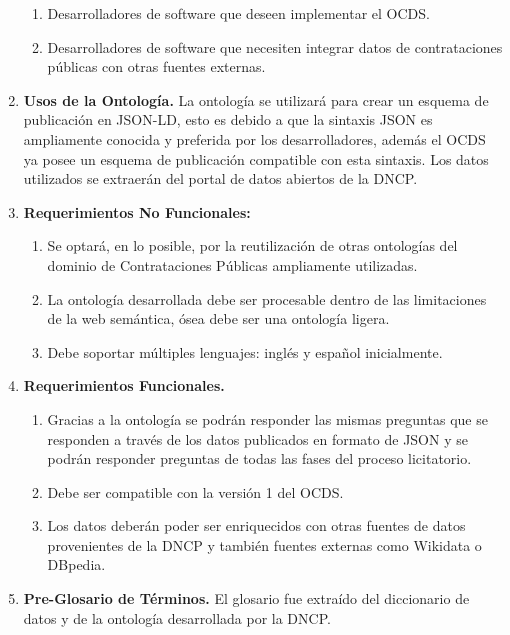 \begin{enumerate}
\begin{enumerate}
    \item Desarrolladores de software que deseen implementar el OCDS.
    \item Desarrolladores de software que necesiten integrar datos de contrataciones públicas con otras fuentes externas. \end{enumerate}
\item \textbf{Usos de la Ontología. }La ontología se utilizará para crear un esquema de publicación en JSON-LD, esto es debido a que la sintaxis JSON es ampliamente conocida y preferida por los desarrolladores, además el OCDS ya posee un esquema de publicación compatible con esta sintaxis. Los datos utilizados se extraerán del portal de datos abiertos de la DNCP.
\item \textbf{Requerimientos No Funcionales: }
\begin{enumerate}
    \item Se optará, en lo posible, por la reutilización de otras ontologías del dominio de Contrataciones Públicas ampliamente utilizadas.
    \item La ontología desarrollada debe ser procesable dentro de las limitaciones de la web semántica, ósea debe ser una ontología ligera.
    \item Debe soportar múltiples lenguajes: inglés y español inicialmente.
\end{enumerate}
\item \textbf{Requerimientos Funcionales. }
    \begin{enumerate}
        \item Gracias a la ontología se podrán responder las mismas preguntas que se responden a través de los datos publicados en formato de JSON y se podrán responder preguntas de todas las fases del proceso licitatorio.
        \item Debe ser compatible con la versión 1 del OCDS.
        \item Los datos deberán poder ser enriquecidos con otras fuentes de datos provenientes de la DNCP y también fuentes externas como Wikidata o DBpedia.
    \end{enumerate}
\item \textbf{Pre-Glosario de Términos.} El glosario fue extraído del diccionario de datos y de la ontología desarrollada por la DNCP. 
\end{enumerate}

\subsection{}

